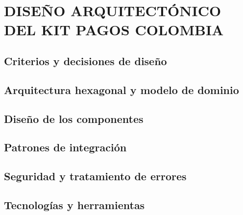 \setcounter{subsection}{0}
\section{DISEÑO ARQUITECTÓNICO DEL KIT PAGOS COLOMBIA}

\subsection{Criterios y decisiones de diseño}

\subsection{Arquitectura hexagonal y modelo de dominio}

\subsection{Diseño de los componentes}

\subsection{Patrones de integración}

\subsection{Seguridad y tratamiento de errores}

\subsection{Tecnologías y herramientas}
